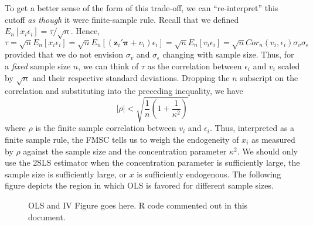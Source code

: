 \documentclass[12pt]{article}
\theoremstyle{definition}
\begin{document}
To get a better sense of the form of this trade-off, we can ``re-interpret'' this cutoff \emph{as though} it were finite-sample rule. Recall that we defined $E_n[x_i\epsilon_i]= \tau/\sqrt{n}$. Hence,
  $$\tau = \sqrt{n} E_n[x_i \epsilon_i] = \sqrt{n}E_n\left[\left(\mathbf{z}_i' \boldsymbol{\pi} + v_i\right)\epsilon_i \right] = \sqrt{n} E_n[v_i\epsilon_i] = \sqrt{n} Cor_n(v_i, \epsilon_i) \sigma_v \sigma_\epsilon$$
provided that we do not envision $\sigma_v$ and $\sigma_\epsilon$ changing with sample size. Thus, for a \emph{fixed} sample size $n$, we can think of $\tau$ as the correlation between $\epsilon_i$ and $v_i$ scaled by $\sqrt{n}$ and their respective standard deviations. Dropping the $n$ subscript on the correlation and substituting into the preceding inequality, we have
  $$|\rho|  < \sqrt{\frac{1}{n}\left(1 + \frac{1}{\kappa^2}\right)}$$
where $\rho$ is the finite sample correlation between $v_i$ and $\epsilon_i$. Thus, interpreted as a finite sample rule, the FMSC tells us to weigh the endogeneity of $x_i$ as measured by $\rho$ against the sample size and the concentration parameter $\kappa^2$. We should only use the 2SLS estimator when the concentration parameter is sufficiently large, the sample size is sufficiently large, or $x$ is sufficiently endogenous. The following figure depicts the region in which OLS is favored for different sample sizes.

\begin{figure}
  \caption{OLS and IV Figure goes here. R code commented out in this document.}
\end{figure}
  
          


\end{document}
